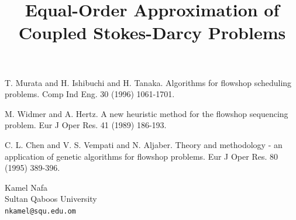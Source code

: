 \documentclass[article, A4, 11pt]{llncs}%
\begin{document}

\begin{thebibliography}{10}
{\sc T. Murata and H. Ishibuchi and H. Tanaka}. {Algorithms for flowshop scheduling problems}. Comp Ind Eng. 30 (1996) 1061-1701.

{\sc M. Widmer and A. Hertz}. {A new heuristic method for the flowshop sequencing problem}. Eur J Oper Res. 41 (1989) 186-193.

{\sc C. L. Chen and V. S. Vempati and N. Aljaber}. {Theory and methodology - an application of genetic algorithms for flowshop problems}. Eur J Oper Res. 80 (1995) 389-396.
\end{thebibliography} %

\title{Equal-Order Approximation of Coupled Stokes-Darcy Problems}
 \author{} \institute{}
\maketitle
\begin{center}
{\large Kamel Nafa}\\
Sultan Qaboos University\\
{\tt nkamel@squ.edu.om}
\end{center}
\end{document}
